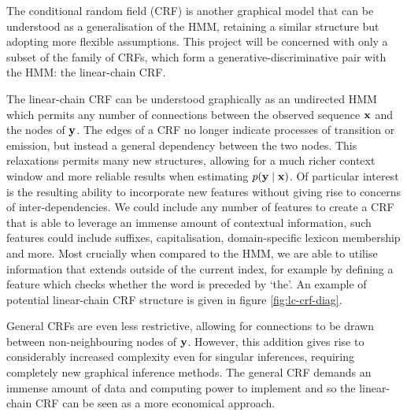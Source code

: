 \documentclass[../main.tex]{subfiles}
\begin{document}

The conditional random field (CRF) \autocite{lafferty-crf-2001} is another graphical model that can be understood as a generalisation of the HMM, retaining a similar structure but adopting more flexible assumptions.
This project will be concerned with only a subset of the family of CRFs, which form a generative-discriminative pair with the HMM: the linear-chain CRF.

The linear-chain CRF can be understood graphically as an undirected HMM which permits any number of connections between the observed sequence $\mathbf{x}$ and the nodes of $\mathbf{y}$.
The edges of a CRF no longer indicate processes of transition or emission, but instead a general dependency between the two nodes.
This relaxations permits many new structures, allowing for a much richer context window and more reliable results when estimating $p(\mathbf{y} \mid \mathbf{x})$.
Of particular interest is the resulting ability to incorporate new features without giving rise to concerns of inter-dependencies.
We could include any number of features to create a CRF that is able to leverage an immense amount of contextual information, such features could include suffixes, capitalisation, domain-specific lexicon membership and more. Most crucially when compared to the HMM, we are able to utilise information that extends outside of the current index, for example by defining a feature which checks whether the word is preceded by `the'.
An example of potential linear-chain CRF structure is given in figure \ref{fig:lc-crf-diag}.

General CRFs are even less restrictive, allowing for connections to be drawn between non-neighbouring nodes of $\mathbf{y}$. However, this addition gives rise to considerably increased complexity even for singular inferences, requiring completely new graphical inference methods.
The general CRF demands an immense amount of data and computing power to implement and so the linear-chain CRF can be seen as a more economical approach.
\end{document}
